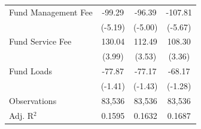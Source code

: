 {\begin{tabular}{l*{3}{c}}
\addlinespace
Fund Management Fee &      -99.29\sym{***}&      -96.39\sym{***}&     -107.81\sym{***}\\
                    &     (-5.19)         &     (-5.00)         &     (-5.67)         \\
\addlinespace
Fund Service Fee    &      130.04\sym{***}&      112.49\sym{***}&      108.30\sym{***}\\
                    &      (3.99)         &      (3.53)         &      (3.36)         \\
\addlinespace
Fund Loads          &      -77.87         &      -77.17         &      -68.17         \\
                    &     (-1.41)         &     (-1.43)         &     (-1.28)         \\
\midrule
Observations        &      83,536         &      83,536         &      83,536         \\
Adj. R$^{2}$        &      0.1595         &      0.1632         &      0.1687         \\
\bottomrule
\end{tabular}
}
